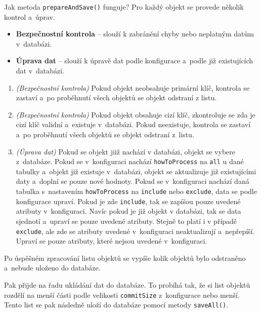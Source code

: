 Jak metoda \texttt{prepareAndSave()} funguje?
Pro každý objekt se provede několik kontrol a~úprav.
\begin{itemize}
    \item \textbf{Bezpečnostní kontrola} -- slouží k zabránění chyby nebo neplatným datům v~databázi.
    \item \textbf{Úprava dat} -- slouží k úpravě dat podle konfigurace a~podle již existujících dat v~databázi.
\end{itemize}
\begin{enumerate}
    \item \textit{(Bezpečnostní kontrola)} Pokud objekt neobsahuje primární klíč, kontrola se zastaví a~po proběhnutí všech objektů se objekt odstraní z listu.
    \item \textit{(Bezpečnostní kontrola)} Pokud objekt obsahuje cizí klíč, zkontroluje se zda je cizí klíč validní a~existuje v~databázi.
    Pokud neexistuje, kontrola se zastaví a~po proběhnutí všech objektů se objekt odstraní z~listu.
    \item \textit{(Úprava dat)} Pokud se objekt jiiž nachází v databázi, objekt se vybere z~databáze.
    Pokud se v~konfiguraci nachází \texttt{howToProcess} na \texttt{all} u dané tabulky a~objekt již existuje v~databázi,
    objekt se aktualizuje již existujícími daty a~doplní se pouze nové hodnoty.
    Pokud se v~konfiguraci nachází daná tabulka s~nastavením \texttt{howToProcess} na \texttt{include} nebo \texttt{exclude}, 
    data se podle konfigurace upraví. Pokud je zde \texttt{include}, tak se zapíšou pouze uvedené atributy v~konfiguraci.
    Navíc pokud je již objekt v databázi, tak se data sjednotí a~upraví se pouze uvedené atributy.
    Stejně to platí i v případě \texttt{exclude}, ale zde se atributy uvedené v~konfiguraci neaktualizují a~nepřepíší.
    Upraví se pouze atributy, které nejsou uvedené v~konfiguraci.     
\end{enumerate}

Po úspěšném zpracování listu objektů se vypíše kolik objektů bylo odstraněno a~nebude uloženo do databáze.

Pak přijde na řadu ukládání dat do databáze.
To probíhá tak, že si list objektů rozdělí na menší části podle velikosti \texttt{commitSize} z~konfigurace nebo menší.
Tento list se pak následně uloží do databáze pomocí metody \texttt{saveAll()}.

